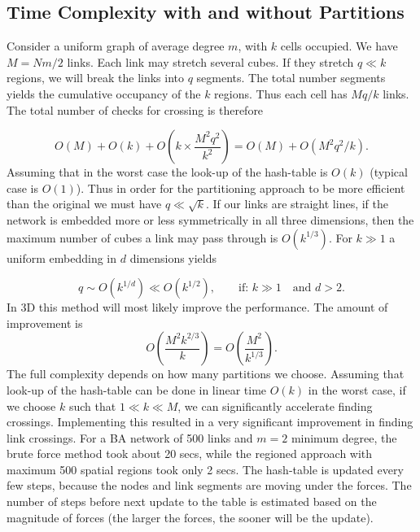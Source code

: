 \documentclass[endfloats,nofootinbib,preprint,floatfix,titlepage,superscriptaddress]{revtex4} %
\begin{document}
\subsection{Time Complexity with and without Partitions}
Consider a uniform graph of average degree $m$, with $k$ cells occupied. We have $M = Nm/2$ links. Each link may stretch several cubes. If they stretch $q \ll k $ regions, we will break the links into $q$ segments. The total number segments yields the cumulative occupancy of the $k$ regions. Thus each cell has $Mq/k$ links. 
The total number of checks for crossing is therefore

$$ O(M) + O(k)+ O\left( k \times \frac{M^2 q^2 }{ k^2} \right)= O(M)+ O(M^2 q^2/k). $$
Assuming that in the worst case the look-up of the hash-table is $O(k)$ (typical case is $O(1)$). Thus in order for the partitioning approach to be more efficient than the original we must have $q \ll \sqrt{k}$. If our links are straight lines, if the network is embedded more or less symmetrically in all three dimensions, then the maximum number of cubes a link may pass through is $O(k^{1/3})$. For $k \gg 1$ a uniform embedding in $d$ dimensions yields 

$$ q \sim O(k^{1/d}) \ll O(k^{1/2}), \qquad \mbox{if: } k\gg1 \quad \mbox{and } d> 2.$$ 
In 3D this method will most likely improve the performance. The amount of improvement is
$$ O\left( \frac{M^2 k^{2/3} }{ k} \right) = O\left(\frac{M^2}{ k^{1/3}} \right). $$
The full complexity depends on how many partitions we choose. 
Assuming that look-up of the hash-table can be done in linear time $O(k)$ in the worst case, if we choose $ k$ such that $1\ll k \ll M$, we can significantly accelerate finding crossings.  
Implementing this resulted in a very significant improvement in finding link crossings. For a BA network of 500 links and $m=2$ minimum degree, the brute force method took about 20 secs, while the regioned approach with maximum 500 spatial regions took only 2 secs. 
The hash-table is updated every few steps, because the nodes and link segments are moving under the forces. 
The number of steps before next update to the table is estimated based on the magnitude of forces (the larger the forces, the sooner will be the update).
\end{document}
